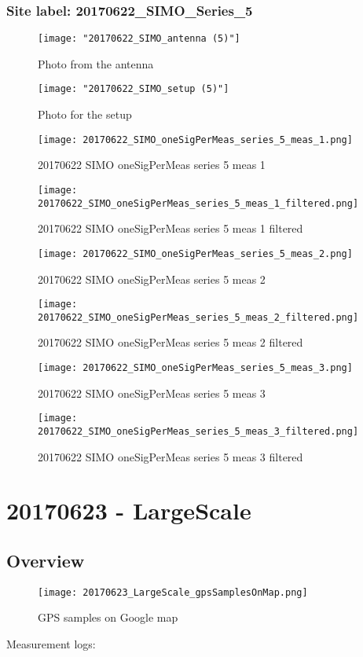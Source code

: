\subsubsection{Site label: 20170622\_SIMO\_Series\_5}
\begin{figure}[ht] \caption{Photo from the antenna}
\texttt{[image: "20170622\_SIMO\_antenna (5)"]}\centering\end{figure}
\begin{figure}[ht] \caption{Photo for the setup}
\texttt{[image: "20170622\_SIMO\_setup (5)"]}\centering\end{figure}
\begin{figure}[ht] \caption{20170622 SIMO oneSigPerMeas series 5 meas 1}
\texttt{[image: 20170622\_SIMO\_oneSigPerMeas\_series\_5\_meas\_1.png]}\centering\end{figure}
\begin{figure}[ht] \caption{20170622 SIMO oneSigPerMeas series 5 meas 1 filtered}
\texttt{[image: 20170622\_SIMO\_oneSigPerMeas\_series\_5\_meas\_1\_filtered.png]}\centering\end{figure}
\begin{figure}[ht] \caption{20170622 SIMO oneSigPerMeas series 5 meas 2}
\texttt{[image: 20170622\_SIMO\_oneSigPerMeas\_series\_5\_meas\_2.png]}\centering\end{figure}
\begin{figure}[ht] \caption{20170622 SIMO oneSigPerMeas series 5 meas 2 filtered}
\texttt{[image: 20170622\_SIMO\_oneSigPerMeas\_series\_5\_meas\_2\_filtered.png]}\centering\end{figure}
\begin{figure}[ht] \caption{20170622 SIMO oneSigPerMeas series 5 meas 3}
\texttt{[image: 20170622\_SIMO\_oneSigPerMeas\_series\_5\_meas\_3.png]}\centering\end{figure}
\begin{figure}[ht] \caption{20170622 SIMO oneSigPerMeas series 5 meas 3 filtered}
\texttt{[image: 20170622\_SIMO\_oneSigPerMeas\_series\_5\_meas\_3\_filtered.png]}\centering\end{figure}
\clearpage
\section{20170623 - LargeScale}
\subsection{Overview}
\begin{figure}[ht] \caption{GPS samples on Google map}
\texttt{[image: 20170623\_LargeScale\_gpsSamplesOnMap.png]}\centering\end{figure}
\begin{minipage}{\textwidth} Measurement logs:

 \end{minipage}
\clearpage
